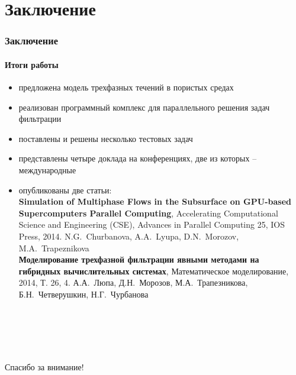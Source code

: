 \section{Заключение}
\begin{frame}
\begin{center}
\frametitle{Заключение}
\framesubtitle{Итоги работы}
\begin{itemize}
  \item предложена модель трехфазных течений в пористых средах
  \vspace{1mm}
  \item реализован программный комплекс для параллельного решения задач фильтрации
  \vspace{1mm}
  \item поставлены и решены несколько тестовых задач
  \vspace{1mm}
  \item представлены четыре доклада на конференциях, две из которых -- международные
  \vspace{1mm}
  \item опубликованы две статьи: \\
      \small{\textbf{Simulation of Multiphase Flows in the Subsurface on GPU-based Supercomputers
      Parallel Computing}, Accelerating Computational Science and Engineering (CSE),
      Advances in Parallel Computing 25, IOS Press, 2014.
      N.G.~Churbanova, A.A.~Lyupa, D.N.~Morozov, M.A.~Trapeznikova} \\
      \vspace{1mm}
      \small{\textbf{Моделирование трехфазной фильтрации явными методами на гибридных вычислительных системах},
      Математическое моделирование, 2014, Т. 26, 4.
      А.А.~Люпа, Д.Н.~Морозов, М.А.~Трапезникова, Б.Н.~Четверушкин, Н.Г.~Чурбанова} \\
      
\end{itemize}
\end{center}
\end{frame}

\begin{frame}
\begin{center}
\frametitle{\ }
\framesubtitle{\ }
\item {\huge Спасибо за внимание!}
\end{center}
\end{frame}